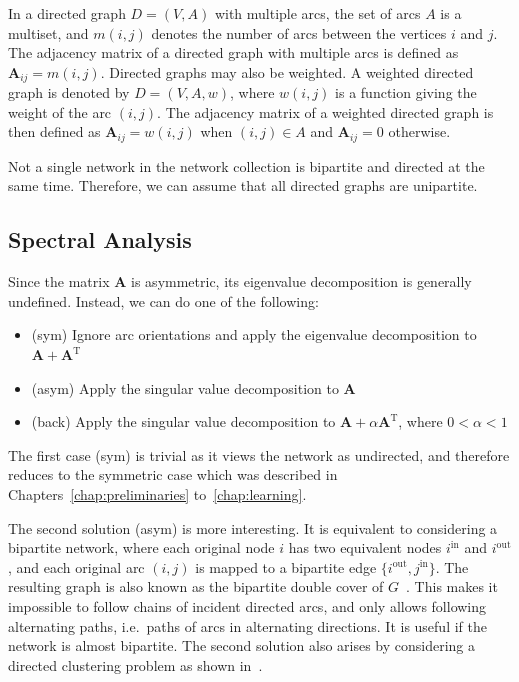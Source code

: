 \documentclass[11pt,a4paper]{book}
\begin{document}
In a directed graph $D=(V,A)$ with multiple arcs, the set of arcs $A$ is a multiset, and
$m(i,j)$ denotes the number of arcs between the vertices $i$ and $j$. 
The adjacency matrix of a directed graph with multiple arcs is defined
as $\mathbf A_{ij}=m(i,j)$. 
Directed graphs may also be weighted.  
A weighted directed graph is denoted by $D=(V,A,w)$, where $w(i,j)$ is a
function giving the weight of the arc $(i,j)$. 
The adjacency matrix of a weighted directed graph is then defined 
as $\mathbf A_{ij} = w(i,j)$ when $(i,j)\in A$ and $\mathbf A_{ij}=0$
otherwise.  

Not a single network in the network collection is bipartite and directed
at the same time.  Therefore, we can assume that all directed graphs are
unipartite. 

\subsection{Spectral Analysis}
\label{sec:directed-spectral-analysis}
Since the matrix $\mathbf A$ is asymmetric, its eigenvalue decomposition
is generally undefined.  
Instead, we can do one of the following:
\begin{itemize}
\item (\textrm{sym}) Ignore arc orientations and apply the eigenvalue
  decomposition to $\mathbf A + \mathbf A^{\mathrm T}$
\item (\textrm{asym}) Apply the singular value decomposition to $\mathbf A$
\item (\textrm{back}) Apply the singular value decomposition to $\mathbf
  A + \alpha \mathbf A^{\mathrm T}$, where $0 < \alpha < 1$
\end{itemize}

The first case (\textrm{sym}) is trivial as it views the network as
undirected, and 
therefore reduces to the symmetric case which was described in
Chapters~\ref{chap:preliminaries} to~\ref{chap:learning}.    

The second solution (\textrm{asym}) is more interesting.  It is
equivalent to 
considering a bipartite network, where each original node $i$ has two
equivalent nodes $i^\mathrm{in}$ and $i^\mathrm{out}$, and each original
arc $(i,j)$ is mapped to a bipartite edge $\{i^\mathrm{out},
j^\mathrm{in}\}$.  
The resulting graph is also known as the bipartite double cover of 
$G$~\cite{b667}. 
This makes it impossible to follow chains of incident
directed arcs, and only allows following alternating paths, i.e.\ paths
of arcs in alternating directions. 
It is useful if the network is almost bipartite.
The second solution also arises by considering a directed clustering
problem as shown in~\cite{b622}. 
\end{document}
